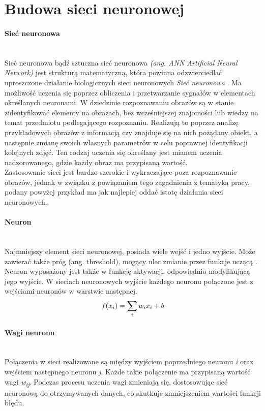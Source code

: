\section{Budowa sieci neuronowej}
\paragraph{Sieć neuronowa} \mbox{}\\
Sieć neuronowa bądź sztuczna sieć neuronowa \textit{(ang. ANN Artificial Neural Network)}
jest strukturą matematyczną, która powinna odzwierciedlać uproszczone działanie biologicznych
sieci neuronowych \textit{Sieć neuronowa} \cite{intuitiveExplanation, WIKIcnn}. Ma możliwość uczenia się poprzez obliczenia i przetwarzanie sygnałów
w elementach określanych neuronami. W dziedzinie rozpoznawaniu obrazów są w stanie zidentyfikować
elementy na obrazach, bez wcześniejszej znajomości lub wiedzy na temat przedmiotu podlegającego
rozpoznaniu. Realizują to poprzez analizę przykładowych obrazów z informacją czy znajduje się
na nich pożądany obiekt, a następnie zmianę swoich własnych parametrów w celu poprawnej
identyfikacji kolejnych zdjęć. Ten rodzaj uczenia się określany jest mianem uczenia nadzorowanego,
gdzie każdy obraz ma przypisaną wartość.\\
Zastosowanie sieci jest bardzo szerokie i wykraczające poza rozpoznawanie obrazów, jednak
w związku z powiązaniem tego zagadnienia z tematyką pracy, podany powyżej przykład ma
jak najlepiej oddać istotę działania sieci neuronowych.

\paragraph{Neuron} \mbox{}\\
Najmniejszy element sieci neuronowej, posiada wiele wejść i jedno wyjście. Może
zawierać także próg (ang. threshold), mogący ulec zmianie przez funkcje uczącą \cite{CS231n_activ, NNbiology, NeuronAnimation}.
Neuron wyposażony jest także w funkcję aktywacji, odpowiednio modyfikującą jego wyjście.
W sieciach neuronowych wyjście każdego neuronu połączone jest z wejściami neuronów
w warstwie następnej.
\begin{equation}
f(x_{i}) = \sum_{i}w_{i}x_{i} + b \\
\end{equation}

\paragraph{Wagi neuronu} \mbox{}\\
Połączenia w sieci realizowane są między wyjściem poprzedniego neuronu \textit{i}
oraz wejściem następnego neuronu \textit{j}. Każde takie połączenie ma przypisaną
wartość wagi \textit{w\textsubscript{ij}}. Podczas procesu uczenia wagi zmieniają
się, dostosowując sieć neuronową do otrzymywanych danych, co skutkuje
zmniejszeniem wartości funkcji błędu.

